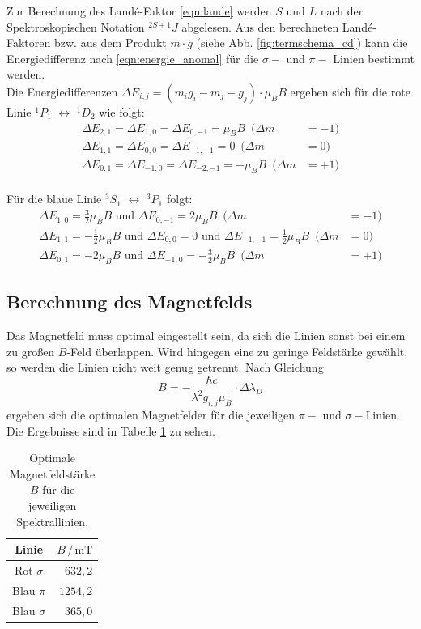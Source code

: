 Zur Berechnung des Landé-Faktor \eqref{eqn:lande} werden $S$ und $L$ nach der Spektroskopischen Notation $^{2S+1}J$ abgelesen.
Aus den berechneten Landé-Faktoren bzw. aus dem Produkt $m \cdot g$ (siehe Abb. \ref{fig:termschema_cd}) kann die Energiedifferenz nach \autoref{eqn:energie_anomal} für die $\sigma-$ und $\pi-$ Linien bestimmt werden.
\\
Die Energiedifferenzen $\Delta E_{i,j} = \left ( m_i g_i - m_j - g_j \right ) \cdot \mu_B B$ ergeben sich für die rote Linie $ ^1 P_1$ $\leftrightarrow$ $^1 D_2$ wie folgt:
\begin{align*}
    \Delta E_{2,1} =  \Delta E_{1,0} = \Delta E_{0,-1} = \mu_B B \,\,\, (\Delta m &= -1) \\
    \Delta E_{1,1} = \Delta E_{0,0} = \Delta E_{-1,-1} = 0 \,\,\, (\Delta m &= 0) \\
    \Delta E_{0,1} =  \Delta E_{-1,0} = \Delta E_{-2,-1} = - \mu_B B \,\,\, (\Delta m &= +1)
\end{align*}
\\
Für die blaue Linie $^3 S_1$ $\leftrightarrow$ $^3 P_1$ folgt:
\begin{align*}
    \Delta E_{1,0} = \frac{3}{2} \mu_B B \,\, \text{und} \,\, \Delta E_{0,-1} = 2 \mu_B B \,\,\, (\Delta m &= -1) \\
    \Delta E_{1,1} = - \frac{1}{2} \mu_B B \,\, \text{und} \,\, \Delta E_{0,0} = 0 \,\, \text{und} \,\, \Delta E_{-1,-1} = \frac{1}{2} \mu_B B \,\,\, (\Delta m &= 0) \\
    \Delta E_{0,1} = -2 \mu_B B \,\, \text{und} \,\, \Delta E_{-1,0} = -\frac{3}{2} \mu_B B \,\,\, (\Delta m &= +1)
\end{align*}
\FloatBarrier

\subsection{Berechnung des Magnetfelds}
Das Magnetfeld muss optimal eingestellt sein, da sich die Linien sonst bei einem zu großen $B$-Feld überlappen.
Wird hingegen eine zu geringe Feldstärke gewählt, so werden die Linien nicht weit genug getrennt.
Nach Gleichung
\begin{equation*}
    B = - \frac{\hbar c}{\lambda^2 g_{i,j} \mu_B} \cdot \Delta \lambda_D
\end{equation*}
ergeben sich die optimalen Magnetfelder für die jeweiligen $\pi-$ und $\sigma-$Linien.
Die Ergebnisse sind in Tabelle \ref{tab:magnetfelder} zu sehen.
\begin{table}
    \centering
    \caption{Optimale Magnetfeldstärke $B$ für die jeweiligen Spektrallinien.}
    \begin{tabular}{c r}
        \toprule
        Linie & $B \, / \, \si{\milli \tesla}$ \\
        \midrule
        Rot $\sigma$ & $632,2$ \\
        Blau $\pi$ & $1254,2$ \\
        Blau $\sigma$ & $365,0$ \\
        \bottomrule
    \end{tabular}
    \label{tab:magnetfelder}
\end{table}